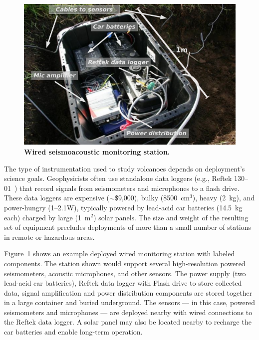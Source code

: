 \begin{figure}[t]
\begin{center}
\includegraphics[width=1.0\hsize]{./2-related/figs/Standalone.pdf}
\end{center}
\caption{\textbf{Wired seismoacoustic monitoring station.}}
\label{related-fig-standalone}
\end{figure}

The type of instrumentation used to study volcanoes depends on deployment's
science goals. Geophysicists often use standalone data loggers (e.g., Reftek
130--01~\cite{reftek}) that record signals from seismometers and microphones
to a flash drive. These data loggers are expensive ($\sim$\$9,000), bulky
(8500~$\mathrm{cm}^3$), heavy (2~kg), and power-hungry (1--2.1W), typically
powered by lead-acid car batteries (14.5~kg each) charged by large
(1~$\mathrm{m}^2$) solar panels. The size and weight of the resulting set of
equipment precludes deployments of more than a small number of stations in
remote or hazardous areas.

Figure~\ref{related-fig-standalone} shows an example deployed wired
monitoring station with labeled components. The station shown would support
several high-resolution powered seismometers, acoustic microphones, and other
sensors. The power supply (two lead-acid car batteries), Reftek data logger
with Flash drive to store collected data, signal amplification and power
distribution components are stored together in a large container and buried
underground. The sensors --- in this case, powered seismometers and
microphones --- are deployed nearby with wired connections to the Reftek data
logger. A solar panel may also be located nearby to recharge the car
batteries and enable long-term operation.

